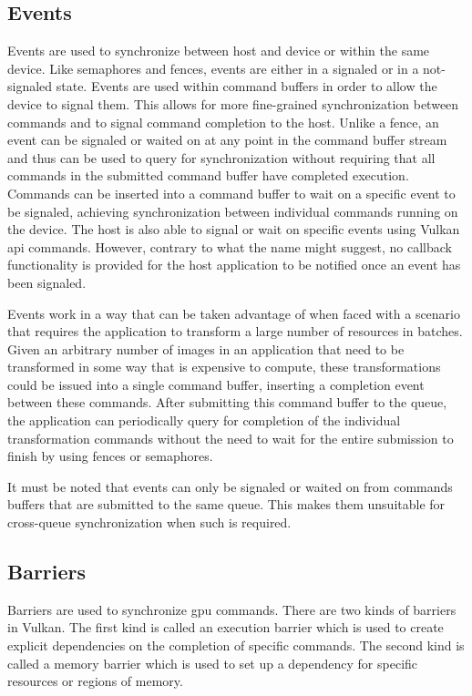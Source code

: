     \subsection{Events}
    \label{sub:Events}
      Events are used to synchronize between host and device or within the same device.
      Like semaphores and fences, events are either in a signaled or in a not-signaled state.
      Events are used within command buffers in order to allow the device to signal them.
      This allows for more fine-grained synchronization between commands and to signal command completion to the host.
      Unlike a fence, an event can be signaled or waited on at any point in the command buffer stream and thus can be used to query for synchronization without requiring that all commands in the submitted command buffer have completed execution.
      Commands can be inserted into a command buffer to wait on a specific event to be signaled, achieving synchronization between individual commands running on the device.
      The host is also able to signal or wait on specific events using Vulkan \gls{api} commands.
      However, contrary to what the name might suggest, no callback functionality is provided for the host application to be notified once an event has been signaled.

      Events work in a way that can be taken advantage of when faced with a scenario that requires the application to transform a large number of resources in batches.
      Given an arbitrary number of images in an application that need to be transformed in some way that is expensive to compute, these transformations could be issued into a single command buffer, inserting a completion event between these commands.
      After submitting this command buffer to the queue, the application can periodically query for completion of the individual transformation commands without the need to wait for the entire submission to finish by using fences or semaphores.

      It must be noted that events can only be signaled or waited on from commands buffers that are submitted to the same queue.
      This makes them unsuitable for cross-queue synchronization when such is required.

    \subsection{Barriers}
    \label{sub:Barriers}
      Barriers are used to synchronize \gls{gpu} commands.
      There are two kinds of barriers in Vulkan.
      The first kind is called an execution barrier which is used to create explicit dependencies on the completion of specific commands.
      The second kind is called a memory barrier which is used to set up a dependency for specific resources or regions of memory.

